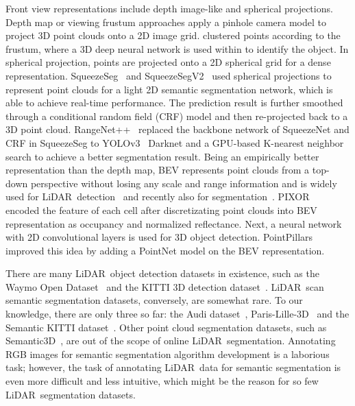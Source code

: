 \documentclass[10pt,twocolumn,letterpaper]{article}
\newcommand{\lidar}{\mbox{LiDAR }}
\begin{document}
Front view representations include depth image-like and spherical projections. Depth map or viewing frustum approaches apply a pinhole camera model to project 3D point clouds onto a 2D image grid. \cite{qi2018frustum} clustered points according to the frustum, where a 3D deep neural network is used within to identify the object. In spherical projection, points are projected onto a 2D spherical grid for a dense representation. SqueezeSeg~\cite{wu2018squeezeseg} and SqueezeSegV2~\cite{wu2019squeezesegv2} used spherical projections to represent point clouds for a light 2D semantic segmentation network, which is able to achieve real-time performance. The prediction result is further smoothed through a conditional random field (CRF) model and then re-projected back to a 3D point cloud. RangeNet++~\cite{milioto2019rangenet++} replaced the backbone network of SqueezeNet and CRF in SqueezeSeg to YOLOv3~\cite{redmon2018yolov3} Darknet and a GPU-based K-nearest neighbor search to achieve a better segmentation result. Being an empirically better representation than the depth map, BEV represents point clouds from a top-down perspective without losing any scale and range information and is widely used for \lidar detection~\cite{wang2019pseudo,yang2018pixor,lang2019pointpillars,ku2018joint,yan2018second} and recently also for segmentation~\cite{zhang2018efficient}. PIXOR~\cite{yang2018pixor} encoded the feature of each cell after discretizating point clouds into BEV representation as occupancy and normalized reflectance. Next, a neural network with 2D convolutional layers is used for 3D object detection. PointPillars~\cite{lang2019pointpillars} improved this idea by adding a PointNet model on the BEV representation.


There are many \lidar object detection datasets in existence, such as the Waymo Open Dataset~\cite{waymo_open_dataset} and the KITTI 3D detection dataset~\cite{geiger2012cvpr}. \lidar scan semantic segmentation datasets, conversely, are somewhat rare. To our knowledge, there are only three so far: the Audi dataset~\cite{aev2019}, Paris-Lille-3D~\cite{roynard2018paris} and the Semantic KITTI dataset~\cite{behley2019iccv}. Other point cloud segmentation datasets, such as Semantic3D~\cite{hackel2017semantic3d}, are out of the scope of online \lidar segmentation. Annotating RGB images for semantic segmentation algorithm development is a laborious task; however, the task of annotating \lidar data for semantic segmentation is even more difficult and less intuitive, which might be the reason for so few \lidar segmentation datasets.
\end{document}
